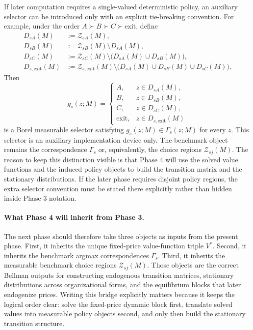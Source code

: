 If later computation requires a single-valued deterministic policy, an auxiliary selector can be introduced only with an explicit tie-breaking convention. For example, under the order $A\succ B\succ C\succ \mathrm{exit}$, define
\begin{align*}
D_{sA}(M)&:=\mathcal Z_{sA}(M),\\
D_{sB}(M)&:=\mathcal Z_{sB}(M)\setminus D_{sA}(M),\\
D_{sC}(M)&:=\mathcal Z_{sC}(M)\setminus\bigl(D_{sA}(M)\cup D_{sB}(M)\bigr),\\
D_{s,\mathrm{exit}}(M)&:=\mathcal Z_{s,\mathrm{exit}}(M)\setminus\bigl(D_{sA}(M)\cup D_{sB}(M)\cup D_{sC}(M)\bigr).
\end{align*}
Then
\[
g_s(z;M)=
\begin{cases}
A, & z\in D_{sA}(M),\\
B, & z\in D_{sB}(M),\\
C, & z\in D_{sC}(M),\\
\mathrm{exit}, & z\in D_{s,\mathrm{exit}}(M)
\end{cases}
\]
is a Borel measurable selector satisfying $g_s(z;M)\in\Gamma_s(z;M)$ for every $z$. This selector is an auxiliary implementation device only. The benchmark object remains the correspondence $\Gamma_s$ or, equivalently, the choice regions $\mathcal Z_{sj}(M)$. The reason to keep this distinction visible is that Phase 4 will use the solved value functions and the induced policy objects to build the transition matrix and the stationary distributions. If the later phase requires disjoint policy regions, the extra selector convention must be stated there explicitly rather than hidden inside Phase 3 notation.

\paragraph{What Phase 4 will inherit from Phase 3.}
The next phase should therefore take three objects as inputs from the present phase. First, it inherits the unique fixed-price value-function triple $V^*$. Second, it inherits the benchmark argmax correspondences $\Gamma_s$. Third, it inherits the measurable benchmark choice regions $\mathcal Z_{sj}(M)$. Those objects are the correct Bellman outputs for constructing endogenous transition matrices, stationary distributions across organizational forms, and the equilibrium blocks that later endogenize prices. Writing this bridge explicitly matters because it keeps the logical order clear: solve the fixed-price dynamic block first, translate solved values into measurable policy objects second, and only then build the stationary transition structure.

